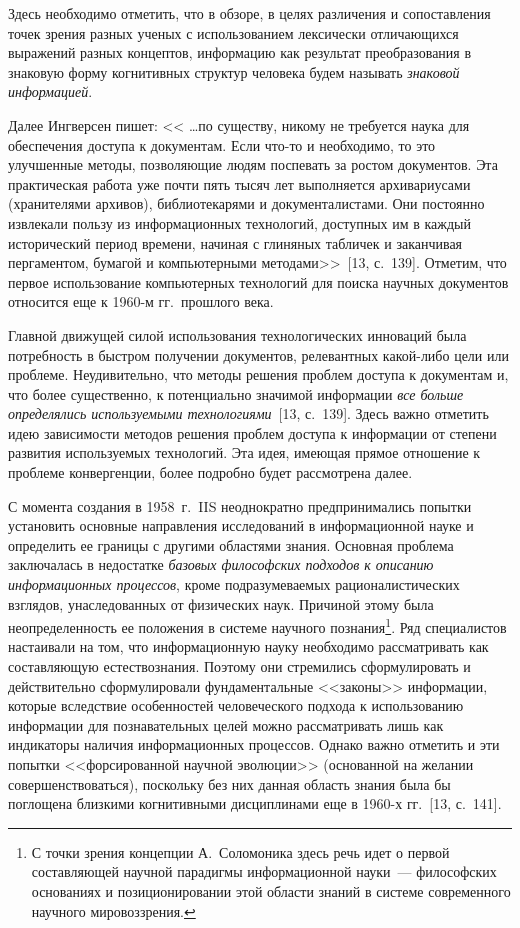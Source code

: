 \begin{multicols}{2}
      Здесь необходимо отметить, что в обзоре, в целях различения и сопоставления точек
зрения разных ученых с использованием лексически отличающихся выражений разных
концептов, информацию как результат преобразования в знаковую форму когнитивных
структур человека будем называть \textit{знаковой информацией}.

      Далее Ингверсен пишет: << \ldots по существу, никому не требуется наука для
обеспечения доступа к документам. Если что-то и необходимо, то это улучшенные методы,
позволяющие людям поспевать за ростом документов. Эта практическая работа уже почти пять
тысяч лет выполняется архивариусами (хранителями архивов), библиотекарями и
документалистами. Они постоянно извлекали пользу из информационных технологий,
доступных им в каждый исторический период времени, начиная с глиняных табличек и
заканчивая пергаментом, бумагой и компьютерными методами>>~[13, с.~139].
Отметим, что первое использование компьютерных технологий для поиска научных
документов относится еще к 1960-м гг.\ прошлого века.

      Главной движущей силой использования технологических инноваций была потребность
в быст\-ром получении документов, релевантных ка\-кой-ли\-бо цели или проблеме. Неудивительно,
что
 мето\-ды решения проблем доступа к документам и, что более существенно, к потенциально
значимой информации \textit{все больше определялись используемыми
технологиями}~[13, с.~139]. Здесь важно отметить идею зависимости методов
решения проблем доступа к инфор\-ма\-ции от степени развития используемых технологий. Эта
идея, имеющая прямое отношение к проблеме конвергенции, более подробно будет
рассмотрена далее.

      С момента создания в 1958~г.\ IIS неоднократно
предпринимались попытки установить основные направления исследований в информационной
науке и определить ее границы с другими областями знания. Основная проблема заключалась в
недостатке \textit{базовых философских подходов к описанию информационных процессов},
кроме подразумеваемых рационалистических взглядов, унаследованных от физических наук.
Причиной этому была неопределенность ее положения в системе научного познания\footnote{С
точки зрения концепции А.~Соломоника здесь речь идет о первой составляющей научной парадигмы
информационной науки~--- философских основаниях и позиционировании этой области знаний в
системе современного научного мировоззрения.}. Ряд специалистов настаивали на том, что
информационную науку необходимо рассматривать как составляющую естествознания.
Поэтому они стремились сформулировать и действительно сформулировали фундаментальные
<<законы>> информации, которые вследствие особенностей человеческого подхода к
использованию информации для познавательных целей можно рассматривать лишь как
индикаторы наличия информационных процессов. Однако важно отметить и эти попытки
<<форсированной научной эволюции>> (основанной на желании совершенствоваться),
поскольку без них данная область знания была бы поглощена близкими когнитивными
дисциплинами еще в 1960-х гг.~[13, с.~141].


\end{multicols}
